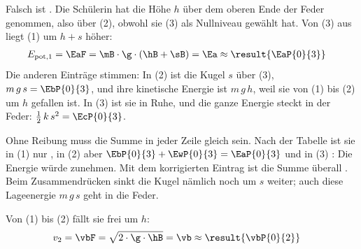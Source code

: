 \begin{abcliste}
\abc
Falsch ist . Die Schülerin hat die Höhe $h$ über dem oberen Ende der Feder genommen, also über (2), obwohl sie (3) als Nullniveau gewählt hat. Von (3) aus liegt (1) um $h + s$ höher:
\begin{align}
 E_\mathrm{pot,1} &= \EaF = \mB\cdot\g\cdot\left(\hB+\sB\right) = \Ea \approx \result{\EaP{0}{3}}
\end{align}
Die anderen Einträge stimmen: In (2) ist die Kugel $s$ über (3), $m\,g\,s = \EbP{0}{3}$, und ihre kinetische Energie ist $m\,g\,h$, weil sie von (1) bis (2) um $h$ gefallen ist. In (3) ist sie in Ruhe, und die ganze Energie steckt in der Feder: $\frac{1}{2}\,k\,s^2 = \EcP{0}{3}$.

\abc
Ohne Reibung muss die Summe in jeder Zeile gleich sein. Nach der Tabelle ist sie in (1) nur , in (2) aber $\EbP{0}{3} + \EwP{0}{3} = \EaP{0}{3}$ und in (3) : Die Energie würde zunehmen. Mit dem korrigierten Eintrag ist die Summe überall . Beim Zusammendrücken sinkt die Kugel nämlich noch um $s$ weiter; auch diese Lageenergie $m\,g\,s$ geht in die Feder.

\abc
Von (1) bis (2) fällt sie frei um $h$:
\begin{align}
 v_2 &= \vbF = \sqrt{2\cdot\g\cdot\hB} = \vb \approx \result{\vbP{0}{2}}
\end{align}
\end{abcliste}
